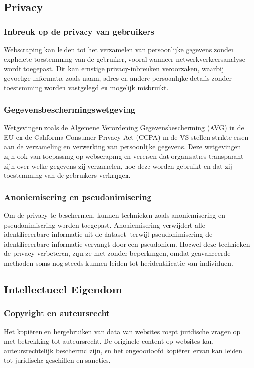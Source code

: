 \subsection{Privacy}
\subsubsection{Inbreuk op de privacy van gebruikers}
Webscraping kan leiden tot het verzamelen van persoonlijke gegevens zonder expliciete toestemming van de gebruiker, vooral wanneer netwerkverkeersanalyse wordt toegepast. Dit kan ernstige privacy-inbreuken veroorzaken, waarbij gevoelige informatie zoals naam, adres en andere persoonlijke details zonder toestemming worden vastgelegd en mogelijk misbruikt.

\subsubsection{Gegevensbeschermingswetgeving}
Wetgevingen zoals de Algemene Verordening Gegevensbescherming (AVG) in de EU en de California Consumer Privacy Act (CCPA) in de VS stellen strikte eisen aan de verzameling en verwerking van persoonlijke gegevens. Deze wetgevingen zijn ook van toepassing op webscraping en vereisen dat organisaties transparant zijn over welke gegevens zij verzamelen, hoe deze worden gebruikt en dat zij toestemming van de gebruikers verkrijgen.

\subsubsection{Anoniemisering en pseudonimisering}
Om de privacy te beschermen, kunnen technieken zoals anoniemisering en pseudonimisering worden toegepast. Anoniemisering verwijdert alle identificeerbare informatie uit de dataset, terwijl pseudonimisering de identificeerbare informatie vervangt door een pseudoniem. Hoewel deze technieken de privacy verbeteren, zijn ze niet zonder beperkingen, omdat geavanceerde methoden soms nog steeds kunnen leiden tot heridentificatie van individuen.

\subsection{Intellectueel Eigendom}
\subsubsection{Copyright en auteursrecht}
Het kopiëren en hergebruiken van data van websites roept juridische vragen op met betrekking tot auteursrecht. De originele content op websites kan auteursrechtelijk beschermd zijn, en het ongeoorloofd kopiëren ervan kan leiden tot juridische geschillen en sancties.

